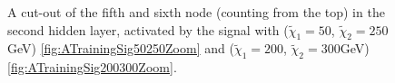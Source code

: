 \begin{figure}
    \caption{A cut-out of the fifth and sixth node (counting from the top) in the second hidden layer, activated 
    by the signal with ($\tilde{\chi}_1=50$, $\tilde{\chi}_2=250$GeV) \ref{fig:ATrainingSig50250Zoom} and 
    ($\tilde{\chi}_1=200$, $\tilde{\chi}_2=300$GeV) \ref{fig:ATrainingSig200300Zoom}.}
    \label{fig:NetVisZoom}
\end{figure}
